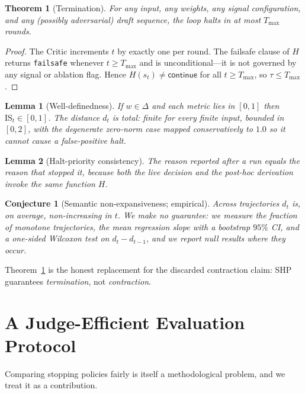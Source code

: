\documentclass[conference]{IEEEtran}
\newtheorem{theorem}{Theorem}
\newtheorem{lemma}{Lemma}
\newtheorem{conjecture}{Conjecture}
\begin{document}
\begin{theorem}[Termination]\label{thm:term}
For any input, any weights, any signal configuration, and any (possibly
adversarial) draft sequence, the loop halts in at most $T_{\max}$ rounds.
\end{theorem}
\begin{proof}
The Critic increments $t$ by exactly one per round. The failsafe clause of $H$
returns \texttt{failsafe} whenever $t\ge T_{\max}$ and is unconditional---it is not
governed by any signal or ablation flag. Hence $H(s_t)\neq\textsf{continue}$ for
all $t\ge T_{\max}$, so $\tau\le T_{\max}$.
\end{proof}

\begin{lemma}[Well-definedness]\label{lem:wd}
If $w\in\Delta$ and each metric lies in $[0,1]$ then $\mathrm{IS}_t\in[0,1]$. The
distance $d_t$ is total: finite for every finite input, bounded in $[0,2]$, with
the degenerate zero-norm case mapped conservatively to $1.0$ so it cannot cause a
false-positive halt.
\end{lemma}

\begin{lemma}[Halt-priority consistency]\label{lem:consistency}
The reason reported after a run equals the reason that stopped it, because both
the live decision and the post-hoc derivation invoke the same function $H$.
\end{lemma}

\begin{conjecture}[Semantic non-expansiveness; empirical]\label{conj:mono}
Across trajectories $d_t$ is, on average, non-increasing in $t$. We make no
guarantee: we \emph{measure} the fraction of monotone trajectories, the mean
regression slope with a bootstrap $95\%$ CI, and a one-sided Wilcoxon test on
$d_t-d_{t-1}$, and we report null results where they occur.
\end{conjecture}

Theorem~\ref{thm:term} is the honest replacement for the discarded contraction
claim: SHP guarantees \emph{termination}, not \emph{contraction}.

\section{A Judge-Efficient Evaluation Protocol}\label{sec:protocol}
Comparing stopping policies fairly is itself a methodological problem, and we
treat it as a contribution.
\end{document}
